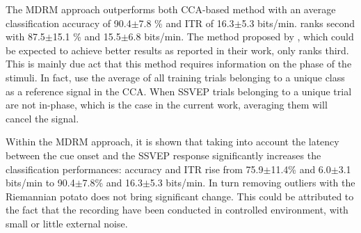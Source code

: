 The MDRM approach outperforms both CCA-based method with an average classification accuracy of 90.4$\pm$7.8 \% and ITR of 16.3$\pm$5.3 bits/min. 
\cite{lin_frequency_2006} ranks second with 87.5$\pm$15.1 \% and 15.5$\pm$6.8 bits/min. 
The method proposed by \cite{nakanishi_high-speed_2014}, which could be expected to achieve better results as reported in their work, only ranks third.
This is mainly due act that this method requires information on the phase of the stimuli. 
In fact, \cite{nakanishi_high-speed_2014} use the average of all training trials belonging to a unique class as a reference signal in the CCA.
When SSVEP trials belonging to a unique trial are not in-phase, which is the case in the current work, averaging them will cancel the signal.

Within the MDRM approach, it is shown that taking into account the latency between the cue onset and the SSVEP response significantly increases the classification performances: accuracy and ITR rise from 75.9$\pm$11.4\% and 6.0$\pm$3.1 bits/min to 90.4$\pm$7.8\% and 16.3$\pm$5.3 bits/min.
In turn removing outliers with the Riemannian potato does not bring significant change.
This could be attributed to the fact that the recording have been conducted in controlled environment, with small or little external noise.  



